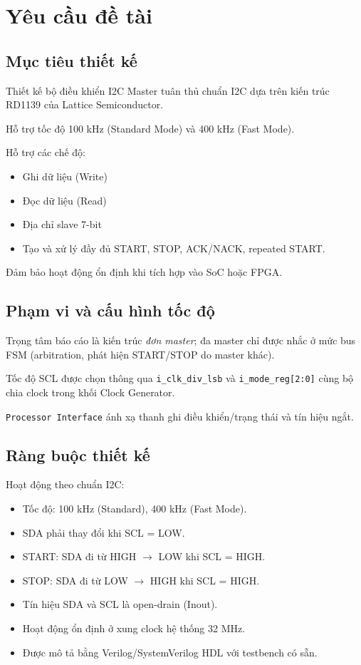\section{Yêu cầu đề tài}

\subsection{Mục tiêu thiết kế}
Thiết kế bộ điều khiển I2C Master tuân thủ chuẩn I2C dựa trên kiến trúc RD1139 của Lattice Semiconductor.

Hỗ trợ tốc độ 100 kHz (Standard Mode) và 400 kHz (Fast Mode).

Hỗ trợ các chế độ:
\begin{itemize}[leftmargin=1.2cm]
    \item Ghi dữ liệu (Write)
    \item Đọc dữ liệu (Read)
    \item Địa chỉ slave 7-bit
    \item Tạo và xử lý đầy đủ START, STOP, ACK/NACK, repeated START.
\end{itemize}

Đảm bảo hoạt động ổn định khi tích hợp vào SoC hoặc FPGA.

\subsection{Phạm vi và cấu hình tốc độ}
Trọng tâm báo cáo là kiến trúc \emph{đơn master}; đa master chỉ được nhắc ở mức bus FSM (arbitration, phát hiện START/STOP do master khác).

Tốc độ SCL được chọn thông qua \texttt{i\_clk\_div\_lsb} và \texttt{i\_mode\_reg[2:0]} cùng bộ chia clock trong khối Clock Generator.

\texttt{Processor Interface} ánh xạ thanh ghi điều khiển/trạng thái và tín hiệu ngắt.

\subsection{Ràng buộc thiết kế}
Hoạt động theo chuẩn I2C:
\begin{itemize}[leftmargin=1.2cm]
    \item Tốc độ: 100 kHz (Standard), 400 kHz (Fast Mode).
    \item SDA phải thay đổi khi SCL = LOW.
    \item START: SDA đi từ HIGH $\rightarrow$ LOW khi SCL = HIGH.
    \item STOP: SDA đi từ LOW $\rightarrow$ HIGH khi SCL = HIGH.
    \item Tín hiệu SDA và SCL là open-drain (Inout).
    \item Hoạt động ổn định ở xung clock hệ thống 32 MHz.
    \item Được mô tả bằng Verilog/SystemVerilog HDL với testbench có sẵn.
\end{itemize}

